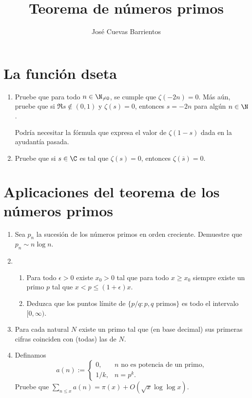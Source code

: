 \documentclass[11pt, reqno]{amsart}
\title{Teorema de números primos}
\date{\DTMdate{2025-10-24}}
\author[José Cuevas]{José Cuevas Barrientos}
\begin{document}
\maketitle

\section{La función dseta}
\begin{enumerate}
	\item Pruebe que para todo $n \in \N_{\ne 0}$, se cumple que $\zeta(-2n) = 0$.
		Más aún, pruebe que si $\Re s \notin (0, 1)$ y $\zeta(s) = 0$, entonces $s = -2n$ para algún $n \in \N$.
		\begin{hint}
			Podría necesitar la fórmula que expresa el valor de $\zeta(1-s)$ dada en la ayudantía pasada.
		\end{hint}

	\item Pruebe que si $s \in \C$ es tal que $\zeta(s) = 0$, entonces $\zeta(\overline{s}) = 0$.
\end{enumerate}

\section{Aplicaciones del teorema de los números primos}
\begin{enumerate}[resume]
	\item Sea $p_n$ la sucesión de los números primos en orden creciente.
		Demuestre que $p_n \sim n\log n$.

	\item
		\begin{enumerate}
			\item Para todo $\epsilon > 0$ existe $x_0 > 0$ tal que para todo $x \ge x_0$ siempre existe un primo $p$ tal que $x
				< p \le (1 + \epsilon)x$.
			\item Deduzca que los puntos límite de $\{ p/q : p, q \text{ primos} \}$ es todo el intervalo $[0, \infty)$.
		\end{enumerate}

	\item Para cada natural $N$ existe un primo tal que (en base decimal) sus primeras cifras coinciden con (todas) las de $N$.

	\item\lookst Definamos
		\[
			a(n) :=
			\begin{cases}
				0, & n \text{ no es potencia de un primo}, \\
				1/k, & n = p^k.
			\end{cases}
		\]
		Pruebe que $\sum_{n\le x} a(n) = \pi(x) + O( \sqrt{x}\log\log x )$.
\end{enumerate}

\nocite{granville:masterclass, hlawka:number}
\printbibliography
\end{document}
